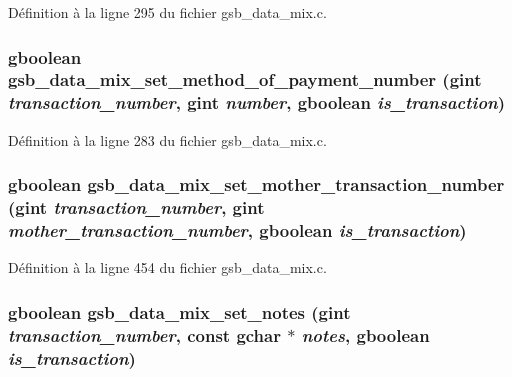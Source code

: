 Définition à la ligne 295 du fichier gsb\_\-data\_\-mix.c.

\subsubsection[{gsb\_\-data\_\-mix\_\-set\_\-method\_\-of\_\-payment\_\-number}]{\setlength{\rightskip}{0pt plus 5cm}gboolean gsb\_\-data\_\-mix\_\-set\_\-method\_\-of\_\-payment\_\-number (gint {\em transaction\_\-number}, \/  gint {\em number}, \/  gboolean {\em is\_\-transaction})}\label{gsb__data__mix_8h_ad3a49dff6f817169bdec431db0f39ddd}


Définition à la ligne 283 du fichier gsb\_\-data\_\-mix.c.

\subsubsection[{gsb\_\-data\_\-mix\_\-set\_\-mother\_\-transaction\_\-number}]{\setlength{\rightskip}{0pt plus 5cm}gboolean gsb\_\-data\_\-mix\_\-set\_\-mother\_\-transaction\_\-number (gint {\em transaction\_\-number}, \/  gint {\em mother\_\-transaction\_\-number}, \/  gboolean {\em is\_\-transaction})}\label{gsb__data__mix_8h_a6f6fc50274dce4f39dd79160eb87dbce}


Définition à la ligne 454 du fichier gsb\_\-data\_\-mix.c.

\subsubsection[{gsb\_\-data\_\-mix\_\-set\_\-notes}]{\setlength{\rightskip}{0pt plus 5cm}gboolean gsb\_\-data\_\-mix\_\-set\_\-notes (gint {\em transaction\_\-number}, \/  const gchar $\ast$ {\em notes}, \/  gboolean {\em is\_\-transaction})}\label{gsb__data__mix_8h_ac86fbf196be1cfb41afdf1ab32436396}


